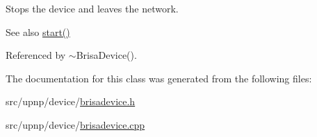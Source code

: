 Stops the device and leaves the network. \begin{DoxySeeAlso}{See also}
\hyperlink{classBrisaUpnp_1_1BrisaDevice_a5f6f1e5eeebfaf63ba0ac669ced3845c}{start()} 
\end{DoxySeeAlso}


Referenced by $\sim$BrisaDevice().

The documentation for this class was generated from the following files:\begin{DoxyCompactItemize}
\item 
src/upnp/device/\hyperlink{brisadevice_8h}{brisadevice.h}\item 
src/upnp/device/\hyperlink{brisadevice_8cpp}{brisadevice.cpp}\end{DoxyCompactItemize}
